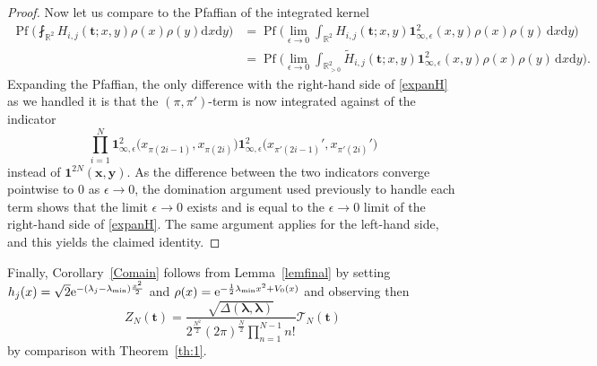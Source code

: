 \documentclass[pdftex]{sigma}
\numberwithin{equation}{section}
\newcommand{\dd}{\mathrm{d}}
\begin{document}
\begin{proof}
Now let us compare to the Pfaffian of the integrated kernel
\begin{align*}
\operatorname{Pf} \biggl( \fint_{\mathbb{R}^2} H_{i,j}(\mathbf{t};x,y) \rho(x)\rho(y) \dd x \dd y\biggr) & = \operatorname{Pf} \biggl(\lim_{\epsilon \rightarrow 0} \int_{\mathbb{R}^2}H_{i,j}(\mathbf{t};x,y) \mathbf{1}_{\infty,\epsilon}^{2}(x,y) \rho(x) \rho(y)\, \dd x \dd y \biggr) \\
& = \operatorname{Pf} \biggl(\lim_{\epsilon \rightarrow 0} \int_{\mathbb{R}_{> 0}^2} \tilde{H}_{i,j}(\mathbf{t};x,y) \mathbf{1}_{\infty,\epsilon} ^2(x,y)\rho(x)\rho(y)\, \dd x \dd y\biggr).
\end{align*}
Expanding the Pfaffian, the only difference with the right-hand side of \eqref{expanH} as we handled it is that the $(\pi,\pi')$-term is now integrated against of the indicator
\[
\prod_{i = 1}^{N} \mathbf{1}^2_{\infty,\epsilon}\bigl(x_{\pi(2i - 1)},x_{\pi(2i)}\bigr) \mathbf{1}^2_{\infty,\epsilon}\bigl(x_{\pi'(2i-1)}',x_{\pi'(2i)}'\bigr)
\]
instead of $\mathbf{1}^{2N}(\boldsymbol{x},\boldsymbol{y})$. As the difference between the two indicators converge pointwise to $0$ as $\epsilon \rightarrow 0$, the domination argument used previously to handle each term shows that the limit $\epsilon \rightarrow 0$ exists and is equal to the $\epsilon \rightarrow 0$ limit of the right-hand side of \eqref{expanH}. The same argument applies for the left-hand side, and this yields the claimed identity.
\end{proof}


Finally, Corollary~\ref{Comain} follows from Lemma~\ref{lemfinal}
by setting
$h_j(x) = \sqrt{2} {\rm e}^{-(\lambda_j-\lambda_{\min})\frac{x^2}{2}}$ and
$\rho(x) = {\rm e}^{-\frac{1}{2}\lambda_{\min} x^2 + V_0(x)}$
and observing then
\[
Z_N(\mathbf{t}) = \frac{\sqrt{\Delta(\boldsymbol{\lambda},\boldsymbol{\lambda})}}{2^{\frac{N^2}{2}} (2\pi)^{\frac{N}{2}} \prod_{n = 1}^{N - 1} n!} \mathcal{T}_N(\mathbf{t})
\]
 by comparison with Theorem~\ref{th:1}.
\end{document}
